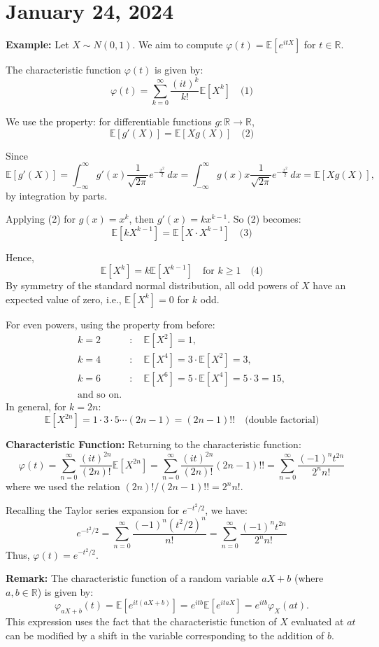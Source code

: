 \newpage
\section{January 24, 2024}
\begin{example}
    \textbf{Example:} Let $X \sim N(0,1)$. We aim to compute $\varphi(t) = \mathbb{E}[e^{itX}]$ for $t \in \mathbb{R}$.

The characteristic function $\varphi(t)$ is given by:
\[
\varphi(t) = \sum_{k=0}^{\infty} \frac{(it)^k}{k!} \mathbb{E}[X^k] \quad \text{(1)}
\]

We use the property: for differentiable functions $g: \mathbb{R} \to \mathbb{R}$,
\[
\mathbb{E}[g'(X)] = \mathbb{E}[X g(X)] \quad \text{(2)}
\]

Since
\[
\mathbb{E}[g'(X)] = \int_{-\infty}^{\infty} g'(x) \frac{1}{\sqrt{2\pi}} e^{-\frac{x^2}{2}} \, dx = \int_{-\infty}^{\infty} g(x) x \frac{1}{\sqrt{2\pi}} e^{-\frac{x^2}{2}} \, dx = \mathbb{E}[X g(X)],
\]
by integration by parts.

Applying (2) for $g(x) = x^k$, then $g'(x) = k x^{k-1}$. So (2) becomes:
\[
\mathbb{E}[k X^{k-1}] = \mathbb{E}[X \cdot X^{k-1}] \quad \text{(3)}
\]

Hence,
\[
\mathbb{E}[X^k] = k \mathbb{E}[X^{k-1}] \quad \text{for } k \geq 1 \quad \text{(4)}
\]
By symmetry of the standard normal distribution, all odd powers of $X$ have an expected value of zero, i.e., $\mathbb{E}[X^k] = 0$ for $k$ odd.

For even powers, using the property from before:
\begin{align*}
k = 2 & : \quad \mathbb{E}[X^2] = 1, \\
k = 4 & : \quad \mathbb{E}[X^4] = 3 \cdot \mathbb{E}[X^2] = 3, \\
k = 6 & : \quad \mathbb{E}[X^6] = 5 \cdot \mathbb{E}[X^4] = 5 \cdot 3 = 15, \\
\text{and so on.}
\end{align*}
In general, for $k = 2n$:
\[
\mathbb{E}[X^{2n}] = 1 \cdot 3 \cdot 5 \cdots (2n - 1) = (2n-1)!! \quad \text{(double factorial)}
\]

\textbf{Characteristic Function:} Returning to the characteristic function:
\[
\varphi(t) = \sum_{n=0}^{\infty} \frac{(it)^{2n}}{(2n)!} \mathbb{E}[X^{2n}] = \sum_{n=0}^{\infty} \frac{(it)^{2n}}{(2n)!} (2n-1)!! = \sum_{n=0}^{\infty} \frac{(-1)^n t^{2n}}{2^n n!}
\]
where we used the relation $(2n)!/(2n-1)!! = 2^n n!$.

Recalling the Taylor series expansion for $e^{-t^2/2}$, we have:
\[
e^{-t^2/2} = \sum_{n=0}^{\infty} \frac{(-1)^n (t^2/2)^n}{n!} = \sum_{n=0}^{\infty} \frac{(-1)^n t^{2n}}{2^n n!}
\]
Thus, $\varphi(t) = e^{-t^2/2}$.
\end{example}
\textbf{Remark:} The characteristic function of a random variable \( aX+b \) (where \( a,b \in \mathbb{R} \)) is given by:
\[
\varphi_{aX+b}(t) = \mathbb{E}\left[e^{it(aX+b)}\right] = e^{itb} \mathbb{E}\left[e^{itaX}\right] = e^{itb} \varphi_X(at).
\]
This expression uses the fact that the characteristic function of \( X \) evaluated at \( at \) can be modified by a shift in the variable corresponding to the addition of \( b \).

